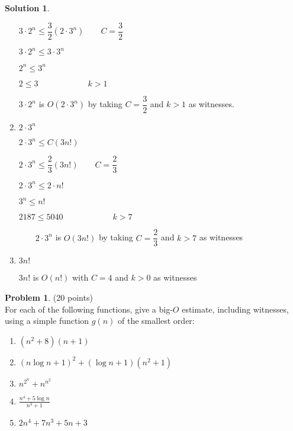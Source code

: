 \documentclass{article}
\theoremstyle{definition}
\newtheorem{problem}{Problem}
\newtheorem*{solution}{Solution}
\begin{document}
\begin{solution}
\begin{enumerate}
\qquad $3\cdot 2^{n}\leq \dfrac{3}{2}(2\cdot 3^{n})\qquad C=\dfrac{3}{2}$

\qquad $3\cdot 2^{n}\leq 3\cdot 3^{n}$

\qquad $2^{n}\leq 3^{n}$

\qquad $2\leq 3\qquad \qquad \qquad k>1$

\qquad $3\cdot 2^{n}$ is $O(2\cdot 3^{n})$ by taking $C=\dfrac{3}{2}$ and $%
k>1$ as witnesses.

\item $2\cdot 3^{n}$

\qquad $2\cdot 3^{n}\leq C(3n!)$

\qquad $2\cdot 3^{n}\leq \dfrac{2}{3}(3n!)\qquad C=\dfrac{2}{3}$

\qquad $2\cdot 3^{n}\leq 2\cdot n!$

\qquad $3^{n}\leq n!$

\qquad $2187\leq 5040\qquad \qquad \qquad k>7$

$\qquad 2\cdot 3^{n}$ is $O(3n!)$ by taking $C=\dfrac{2}{3}$ and $k>7$ as
witnesses$\qquad \qquad $ \bigskip \newline

\item $3n!$ \bigskip 

\qquad $3n!$ is $O(n!)$ with $C=4$ and $k>0$ as witnesses
\end{enumerate}
\end{solution}


\newpage

\begin{problem} (20 points)\\
For each of the following functions, give a big-$O$ estimate, including witnesses, using a simple function $g(n)$ of the smallest order:
\begin{enumerate}
\item $(n^2+8)(n+1)$
\item $(n\log{n} + 1)^2+(\log{n}+1)(n^2+1)$
\item $\displaystyle n^{2^n}+n^{n^2}$
\item $\displaystyle \frac{n^4+5\log{n}}{n^3+1}$
\item $2n^4+7n^3+5n+3$
\end{enumerate}
\end{problem}
\end{document}
